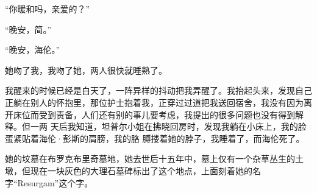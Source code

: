 \documentclass{article}
\begin{document}
“你暖和吗，亲爱的？” 



“晚安，简。” 


“晚安，海伦。” 


她吻了我，我吻了她，两人很快就睡熟了。 

我醒来的时候已经是白天了，一阵异样的抖动把我弄醒了。我抬起头来，发现自己正躺在别人的怀抱里，那位护士抱着我，正穿过过道把我送回宿舍，我没有因为离开床位而受到责备，人们还有别的事儿要考虑，我提出的很多问题也没有得到解释。但一两
\newpage
天后我知道，坦普尔小姐在拂晓回房时，发现我躺在小床上，我的脸蛋紧贴着海伦·彭斯的肩膀，我的胳
膊搂着她的脖子，我睡着了，而海伦死了。 

她的坟墓在布罗克布里奇墓地，她去世后十五年中，墓上仅有一个杂草丛生的土墩，但现在一块灰色的大理石墓碑标出了这个地点，上面刻着她的名字“Resurgam”这个字。
\end{document}
